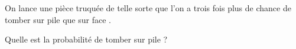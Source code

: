 
On lance une pièce truquée de telle sorte que l'on a trois fois plus de chance de tomber sur \og pile \fg{} que sur \og face \fg.

Quelle est la probabilité de tomber sur \og pile \fg ?

\smallskip
{}
